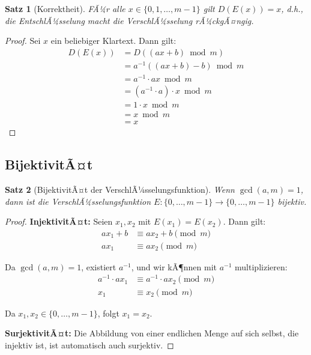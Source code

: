 ﻿\documentclass[12pt,a4paper]{article}
\newtheorem{theorem}{Satz}
\begin{document}
	\begin{theorem}[Korrektheit]
		FÃ¼r alle $x \in \{0, 1, \ldots, m-1\}$ gilt $D(E(x)) = x$, d.h., die EntschlÃ¼sselung macht die VerschlÃ¼sselung rÃ¼ckgÃ¤ngig.
	\end{theorem}
	
	\begin{proof}
		Sei $x$ ein beliebiger Klartext. Dann gilt:
		\begin{align}
			D(E(x)) &= D((ax + b) \bmod m) \\
			&= a^{-1}((ax + b) - b) \bmod m \\
			&= a^{-1} \cdot ax \bmod m \\
			&= (a^{-1} \cdot a) \cdot x \bmod m \\
			&= 1 \cdot x \bmod m \\
			&= x \bmod m \\
			&= x
		\end{align}
	\end{proof}
	
	\subsection{BijektivitÃ¤t}
	
	\begin{theorem}[BijektivitÃ¤t der VerschlÃ¼sselungsfunktion]
		Wenn $\gcd(a,m) = 1$, dann ist die VerschlÃ¼sselungsfunktion $E: \{0,\ldots,m-1\} \to \{0,\ldots,m-1\}$ bijektiv.
	\end{theorem}
	
	\begin{proof}
		\textbf{InjektivitÃ¤t:} Seien $x_1, x_2$ mit $E(x_1) = E(x_2)$. Dann gilt:
		\begin{align}
			ax_1 + b &\equiv ax_2 + b \pmod{m} \\
			ax_1 &\equiv ax_2 \pmod{m}
		\end{align}
		
		Da $\gcd(a,m) = 1$, existiert $a^{-1}$, und wir kÃ¶nnen mit $a^{-1}$ multiplizieren:
		\begin{align}
			a^{-1} \cdot ax_1 &\equiv a^{-1} \cdot ax_2 \pmod{m} \\
			x_1 &\equiv x_2 \pmod{m}
		\end{align}
		
		Da $x_1, x_2 \in \{0,\ldots,m-1\}$, folgt $x_1 = x_2$.
		
		\textbf{SurjektivitÃ¤t:} Die Abbildung von einer endlichen Menge auf sich selbst, die injektiv ist, ist automatisch auch surjektiv.
	\end{proof}
	
\end{document}
